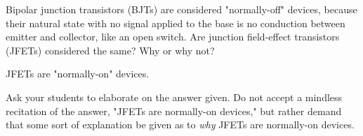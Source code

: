 

Bipolar junction transistors (BJTs) are considered "normally-off" devices, because their natural state with no signal applied to the base is no conduction between emitter and collector, like an open switch.  Are junction field-effect transistors (JFETs) considered the same?  Why or why not?







JFETs are "normally-on" devices.







Ask your students to elaborate on the answer given.  Do not accept a mindless recitation of the answer, "JFETs are normally-on devices," but rather demand that some sort of explanation be given as to {\it why} JFETs are normally-on devices.




